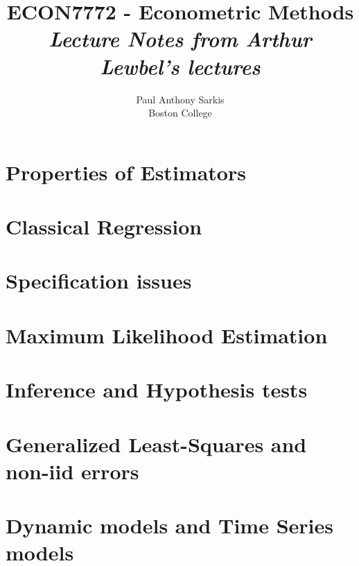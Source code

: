 \documentclass[12pt]{report} %
\begin{document}
\date{}
\title{\textbf{\huge{ECON7772 - Econometric Methods}}\\ \textit{Lecture Notes from Arthur Lewbel's lectures}}
\author{Paul Anthony Sarkis\\ Boston College} 
 
\maketitle

\tableofcontents

\chapter{Properties of Estimators}



\chapter{Classical Regression}



\chapter{Specification issues}



\chapter{Maximum Likelihood Estimation}



\chapter{Inference and Hypothesis tests}



\chapter{Generalized Least-Squares and non-iid errors}



\chapter{Dynamic models and Time Series models}
\end{document}
